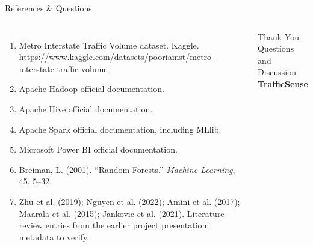 \documentclass[aspectratio=169,11pt]{beamer}
\begin{document}
\begin{frame}{References \& Questions}
\begin{columns}[T,onlytextwidth]
\small
\begin{enumerate}
\item Metro Interstate Traffic Volume dataset. Kaggle.\\
\url{https://www.kaggle.com/datasets/pooriamst/metro-interstate-traffic-volume}
\item Apache Hadoop official documentation.
\item Apache Hive official documentation.
\item Apache Spark official documentation, including MLlib.
\item Microsoft Power BI official documentation.
\item Breiman, L. (2001). ``Random Forests.'' \textit{Machine Learning}, 45, 5--32.
\item Zhu et al. (2019); Nguyen et al. (2022); Amini et al. (2017); Maarala et al. (2015); Jankovic et al. (2021). Literature-review entries from the earlier project presentation; metadata to verify.
\end{enumerate}
\begin{center}
\vspace{1cm}
{\Huge\textcolor{TrafficBlue}{Thank You}}\\[4mm]
{\large Questions and Discussion}\\[8mm]
\textbf{TrafficSense}
\end{center}
\end{columns}
\end{frame}
\end{document}
